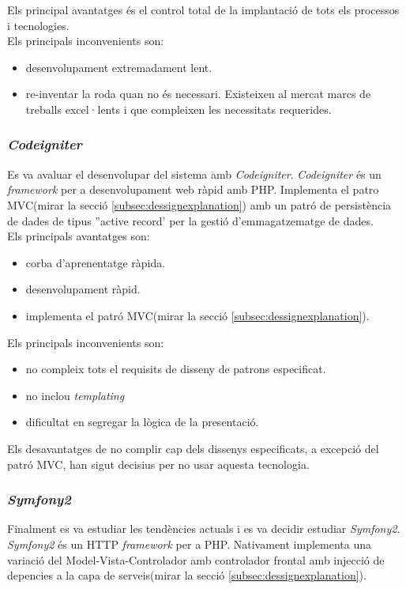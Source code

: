 Els principal avantatges \'{e}s el control total de la implantaci\'{o} de tots els processos i tecnologies.\\

Els principals inconvenients son:
\begin{itemize} 
\item desenvolupament extremadament lent.
\item re-inventar la roda quan no \'{e}s necessari. Existeixen al mercat marcs de treballs excel·lents i que compleixen les necessitats requerides.
\end{itemize} 

\subsubsection{\textit{Codeigniter}}
Es va avaluar el desenvolupar del sistema amb \textit{Codeigniter}. \textit{Codeigniter} \'{e}s un \textit{framework} per a desenvolupament web r\`{a}pid amb PHP.\cite{codeigniter} Implementa el patro MVC(mirar la secció \ref{subsec:dessignexplanation}) amb un patró de persistència de dades de tipus ''active record' per la gesti\'{o} d'emmagatzematge de dades.\cite{activerecord}\\

Els principals avantatges son:
\begin{itemize}
\item corba d'aprenentatge r\`{a}pida.
\item desenvolupament r\`{a}pid.
\item implementa el patr\'{o} MVC(mirar la secció \ref{subsec:dessignexplanation}).
\end{itemize}

Els principals inconvenients son:
\begin{itemize}
\item no compleix tots el requisits de disseny de patrons especificat.
\item no inclou \textit{templating}
\item dificultat en segregar la l\`{o}gica de la presentaci\'{o}.
\end{itemize}

Els desavantatges de no complir cap dels dissenys especificats, a excepció del patró MVC, han sigut decisius per no usar aquesta tecnologia.

\subsubsection{\textit{Symfony2}}
Finalment es va estudiar les tendències actuals i es va decidir estudiar \textit{Symfony2}.\cite{symfony} \textit{Symfony2} \'{e}s un HTTP \textit{framework} per a PHP. Nativament implementa una variaci\'{o} del Model-Vista-Controlador amb controlador frontal amb injecci\'{o} de depencies a la capa de serveis(mirar la secció \ref{subsec:dessignexplanation}).\\

